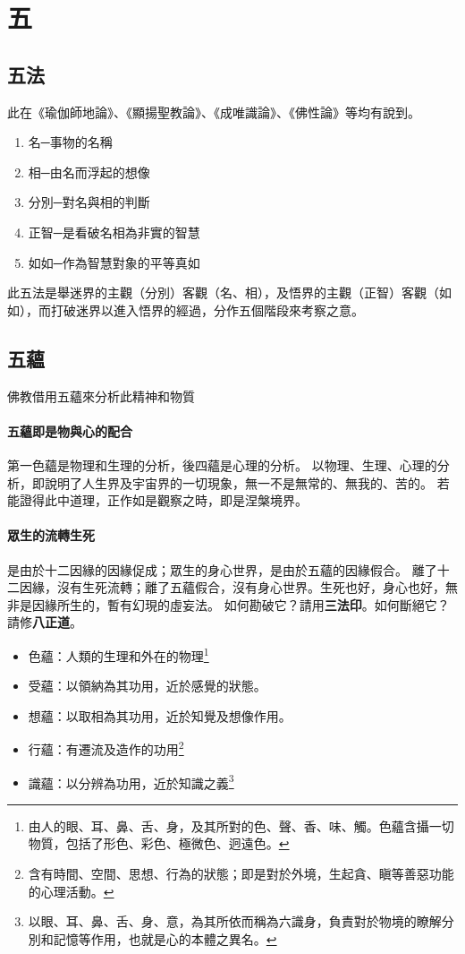 \section{五}

\subsection{五法}
此在《瑜伽師地論》、《顯揚聖教論》、《成唯識論》、《佛性論》等均有說到。
\begin{enumerate}
  \item 名─事物的名稱
  \item 相─由名而浮起的想像
  \item 分別─對名與相的判斷
  \item 正智─是看破名相為非實的智慧
  \item 如如─作為智慧對象的平等真如
\end{enumerate}
此五法是舉迷界的主觀（分別）客觀（名、相），及悟界的主觀（正智）客觀（如如），而打破迷界以進入悟界的經過，分作五個階段來考察之意。



\subsection{五蘊}
佛教借用五蘊來分析此精神和物質
\paragraph{五蘊即是物與心的配合}
第一色蘊是物理和生理的分析，後四蘊是心理的分析。
以物理、生理、心理的分析，即說明了人生界及宇宙界的一切現象，無一不是無常的、無我的、苦的。
若能證得此中道理，正作如是觀察之時，即是涅槃境界。
\paragraph{眾生的流轉生死} 是由於十二因緣的因緣促成；眾生的身心世界，是由於五蘊的因緣假合。
離了十二因緣，沒有生死流轉；離了五蘊假合，沒有身心世界。生死也好，身心也好，無非是因緣所生的，暫有幻現的虛妄法。
如何勘破它？請用\textbf{三法印}。如何斷絕它？請修\textbf{八正道}。

\begin{itemize}
  \item 色蘊：人類的生理和外在的物理\footnote{由人的眼、耳、鼻、舌、身，及其所對的色、聲、香、味、觸。色蘊含攝一切物質，包括了形色、彩色、極微色、迥遠色。}
  \item 受蘊：以領納為其功用，近於感覺的狀態。
  \item 想蘊：以取相為其功用，近於知覺及想像作用。
  \item 行蘊：有遷流及造作的功用\footnote{含有時間、空間、思想、行為的狀態；即是對於外境，生起貪、瞋等善惡功能的心理活動。}
  \item 識蘊：以分辨為功用，近於知識之義\footnote{以眼、耳、鼻、舌、身、意，為其所依而稱為六識身，負責對於物境的瞭解分別和記憶等作用，也就是心的本體之異名。}
\end{itemize}


